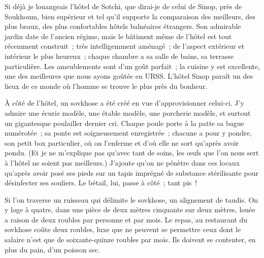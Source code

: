 \documentclass[french,twoside]{book} %
\newcommand{\astermono}{\medskip\centerline{\color{rubric}\large\selectfont{\syms ✻}}\medskip\par}%
\begin{document}
\astermono

\noindent Si déjà je louangeais l’hôtel de Sotchi, que dirai-je de celui de Sinop, près de Soukhoum, bien supérieur et tel qu’il supporte la comparaison des meilleurs, des plus beaux, des plus confortables hôtels balnéaires étrangers. Son admirable jardin date de l’ancien régime, mais le bâtiment même de l’hôtel est tout récemment construit ; très intelligemment aménagé ; de l’aspect extérieur et intérieur le plus heureux ; chaque chambre a sa salle de bains, sa terrasse particulière. Les ameublements sont d’un goût parfait ; la cuisine y est excellente, une des meilleures que nous ayons goûtée en URSS. L’hôtel Sinop paraît un des lieux de ce monde où l’homme se trouve le plus près du bonheur.\par
À côté de l’hôtel, un sovkhose a été créé en vue d’approvisionner celui-ci. J’y admire une écurie modèle, une étable modèle, une porcherie modèle, et surtout un gigantesque poulailler dernier cri. Chaque poule porte à la patte sa bague numérotée ; sa ponte est soigneusement enregistrée ; chacune a pour y pondre, son petit box particulier, où on l’enferme et d’où elle ne sort qu’après avoir pondu. (Et je ne m’explique pas qu’avec tant de soins, les œufs que l’on nous sert à l’hôtel ne soient pas meilleurs.) J’ajoute qu’on ne pénètre dans ces locaux qu’après avoir posé ses pieds sur un tapis imprégné de substance stérilisante pour désinfecter ses souliers. Le bétail, lui, passe à côté ; tant pis !\par
Si l’on traverse un ruisseau qui délimite le sovkhose, un alignement de taudis. On y loge à quatre, dans une pièce de deux mètres cinquante sur deux mètres, louée a raison de deux roubles par personne et par mois. Le repas, au restaurant du sovkhose coûte deux roubles, luxe que ne peuvent se permettre ceux dont le salaire n’est que de soixante-quinze roubles par mois. Ils doivent se contenter, en plus du pain, d’un poisson sec.\par

\astermono
\end{document}

